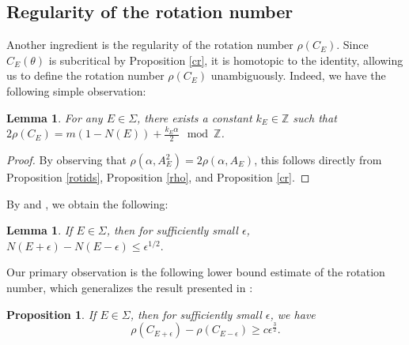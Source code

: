 \documentclass[11pt]{amsart}
\newtheorem{lemma}[theorem]{Lemma}
\newtheorem{prop}[theorem]{Proposition}
\theoremstyle{remark}
\theoremstyle{definition}
\begin{document}
\subsection{Regularity of the rotation number}
Another ingredient is the regularity of the rotation number $\rho(C_E)$. Since $C_E(\theta)$ is subcritical by Proposition \ref{cr}, it is homotopic to the identity, allowing us to define the rotation number $\rho(C_E)$ unambiguously. Indeed, we have the following simple observation:

\begin{lemma}\label{rho-c}
For any \(E \in \Sigma\), there exists a constant \(k_E \in \mathbb{Z}\) such that \(2\rho(C_E) = m(1 - N(E)) + \frac{k_E \alpha}{2} \mod \mathbb{Z}\).
\end{lemma}

\begin{proof}
By observing that \(\rho(\alpha, A_E^2) = 2\rho(\alpha, A_E)\), this follows directly from Proposition \ref{rotids}, Proposition \ref{rho}, and Proposition \ref{cr}.
\end{proof}

By \cite[Theorem 2.3]{GJ} and \cite[Theorem 1.3]{HS}, we obtain the following:

\begin{lemma}\cite{GJ,HS}\label{holder}
    If $E\in\Sigma$, then for sufficiently small $\epsilon$,
    $N(E+\epsilon)-N(E-\epsilon)\leq \epsilon^{1/2}.$
\end{lemma}

Our primary observation is the following lower bound estimate of the rotation number, which generalizes the result presented in \cite[Lemma 3.11]{Avila: ac}:


\begin{prop}\label{holderl}
	If $E\in\Sigma$, then for sufficiently small $\epsilon$, we have $$\rho(C_{E+\epsilon})-\rho(C_{E-\epsilon})\geq c\epsilon^{\frac{3}{2}}.$$
\end{prop}
\end{document}
